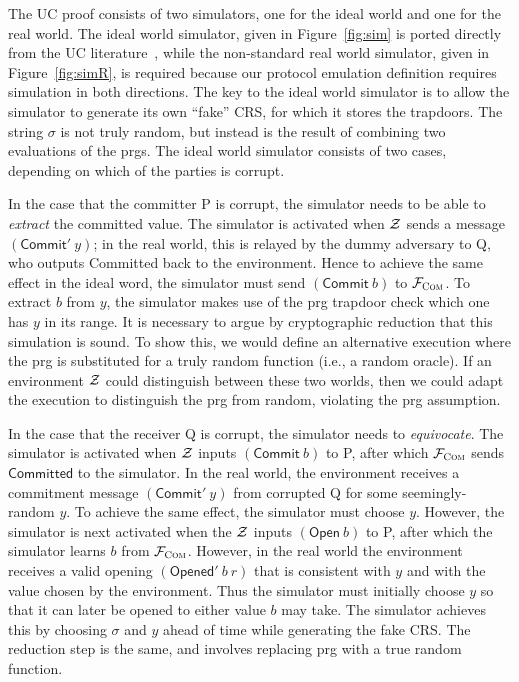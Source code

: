 The UC proof consists of two simulators, one for the ideal world and one for the real world.
The ideal world simulator, given in Figure~\ref{fig:sim} is ported directly from the UC literature~\cite{canetti2001commitments}, while the non-standard real world simulator, given in Figure~\ref{fig:simR}, is required because our protocol emulation definition requires simulation in both directions.
The key to the ideal world simulator is to allow the simulator to generate its own ``fake'' CRS, for which it stores the trapdoors. The string $\sigma$ is not truly random, but instead is the result of combining two evaluations of the prgs.
The ideal world simulator consists of two cases, depending on which of the parties is corrupt.

In the case that the committer P is corrupt, the simulator needs to be able to \emph{extract} the committed value. The simulator is activated when $\mathcal{{Z}}$ sends a message $(\mathsf{Commit}' ~ y)$; in the real world, this is relayed by the dummy adversary to Q, who outputs \textsf{Committed} back to the environment. Hence to achieve the same effect in the ideal word, the simulator must send $(\mathsf{Commit}~b)$ to $\mathcal{{F}}_{\textsc{Com}}$. To extract $b$ from $y$, the simulator makes use of the prg trapdoor check which one has $y$ in its range.
It is necessary to argue by cryptographic reduction that this simulation is sound.
To show this, we would define an alternative execution where the prg is substituted for a truly random function (i.e., a random oracle). If an environment $\mathcal{{Z}}$ could distinguish between these two worlds, then we could adapt the execution to distinguish the prg from random, violating the prg assumption.

In the case that the receiver Q is corrupt, the simulator needs to \emph{equivocate}.
The simulator is activated when $\mathcal{{Z}}$ inputs $(\mathsf{Commit}~b)$ to P, after which $\mathcal{{F}}_{\textsc{Com}}$ sends $\mathsf{Committed}$ to the simulator.
In the real world, the environment receives a commitment message $(\mathsf{Commit}'~y)$ from corrupted Q for some seemingly-random $y$. To achieve the same effect, the simulator must choose $y$. However, the simulator is next activated when the $\mathcal{{Z}}$ inputs $(\mathsf{Open}~b)$ to P, after which the simulator learns $b$ from $\mathcal{{F}}_{\textsc{Com}}$. However, in the real world the environment receives a valid opening $(\mathsf{Opened}'~b~r)$ that is consistent with  $y$ and with the value chosen by the environment. Thus the simulator must initially choose $y$ so that it can later be opened to either value $b$ may take. The simulator achieves this by choosing $\sigma$ and $y$ ahead of time while generating the fake CRS. The reduction step is the same, and involves replacing prg with a true random function.

